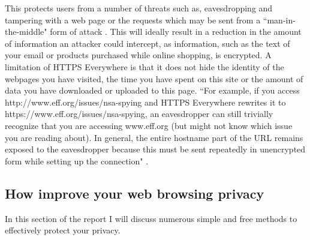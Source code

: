 \documentclass[12pt]{article}
\begin{document}
This protects users from a number of threats such as, eavesdropping and tampering with a web page or the requests which may be sent from a ``man-in-the-middle" form of attack \parencite{httpsEverywhere}. This will ideally result in a reduction in the amount of information an attacker could intercept, as information, such as the text of your email or products purchased while online shopping, is encrypted. A limitation of HTTPS Everywhere is that it does not hide the identity of the webpages you have visited, the time you have spent on this site or the amount of data you have downloaded or uploaded to this page. ``For example, if you access http://www.eff.org/issues/nsa-spying and HTTPS Everywhere rewrites it to https://www.eff.org/issues/nsa-spying, an eavesdropper can still trivially recognize that you are accessing www.eff.org (but might not know which issue you are reading about). In general, the entire hostname part of the URL remains exposed to the eavesdropper because this must be sent repeatedly in unencrypted form while setting up the connection" \parencite{httpsEverywhere}.

\subsection{How improve your web browsing privacy}
In this section of the report I will discuss numerous simple and free methods to effectively protect your privacy. 
\end{document}
